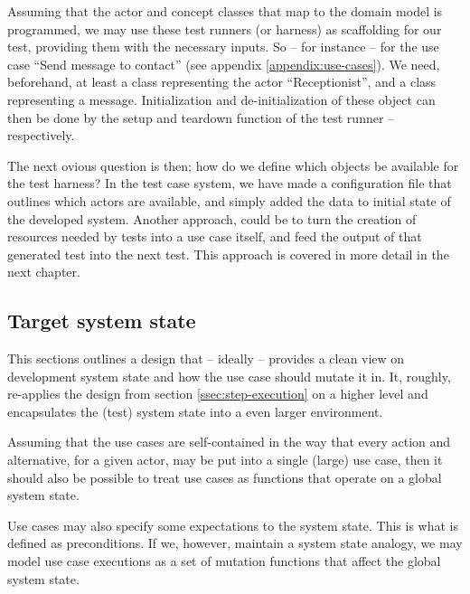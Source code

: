 \noindent Assuming that the actor and concept classes that map to the domain model is programmed, we may use these test runners (or harness) as scaffolding for our test, providing them with the necessary inputs. So -- for instance -- for the use case ``Send message to contact'' (see appendix \ref{appendix:use-cases}). We need, beforehand, at least a class representing the actor ``Receptionist'', and a class representing a message. Initialization and de-initialization of these object can then be done by the setup and teardown function of the test runner -- respectively.\medskip

\noindent The next ovious question is then; how do we define which objects be available for the test harness? In the test case system, we have made a configuration file that outlines which actors are available, and simply added the data to initial state of the developed system. Another approach, could be to turn the creation of resources needed by tests into a use case itself, and feed the output of that generated test into the next test. This approach is covered in more detail in the next chapter.

\subsection{Target system state}
\label{ssec:target-system-state}
This sections outlines a design that -- ideally -- provides a clean view on development system state and how the use case should mutate it in. It, roughly, re-applies the design from section \ref{ssec:step-execution} on a higher level and encapsulates the (test) system state into a even larger environment.\medskip

\noindent Assuming that the use cases are self-contained\cite{larman2005} in the way that every action and alternative, for a given actor, may be put into a single (large) use case, then it should also be possible to treat use cases as functions that operate on a global system state.\medskip

\noindent Use cases may also specify some expectations to the system state. This is what is defined as preconditions. If we, however, maintain a system state analogy, we may model use case executions as a set of mutation functions that affect the global system state.\medskip

